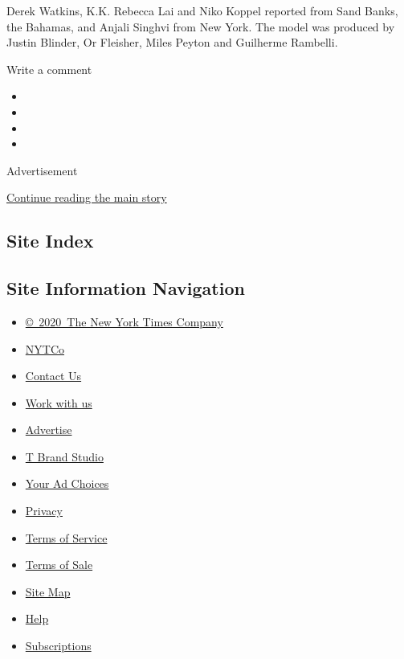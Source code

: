 Derek Watkins, K.K. Rebecca Lai and Niko Koppel reported from Sand
Banks, the Bahamas, and Anjali Singhvi from New York. The model was
produced by Justin Blinder, Or Fleisher, Miles Peyton and Guilherme
Rambelli.

Write a comment

\begin{itemize}
\item
\item
\item
\item
\end{itemize}

Advertisement

\protect\hyperlink{after-bottom}{Continue reading the main story}

\hypertarget{site-index}{%
\subsection{Site Index}\label{site-index}}

\hypertarget{site-information-navigation}{%
\subsection{Site Information
Navigation}\label{site-information-navigation}}

\begin{itemize}
\tightlist
\item
  \href{https://help.nytimes.com/hc/en-us/articles/115014792127-Copyright-notice}{©~2020~The
  New York Times Company}
\end{itemize}

\begin{itemize}
\tightlist
\item
  \href{https://www.nytco.com/}{NYTCo}
\item
  \href{https://help.nytimes.com/hc/en-us/articles/115015385887-Contact-Us}{Contact
  Us}
\item
  \href{https://www.nytco.com/careers/}{Work with us}
\item
  \href{https://nytmediakit.com/}{Advertise}
\item
  \href{http://www.tbrandstudio.com/}{T Brand Studio}
\item
  \href{https://www.nytimes.com/privacy/cookie-policy\#how-do-i-manage-trackers}{Your
  Ad Choices}
\item
  \href{https://www.nytimes.com/privacy}{Privacy}
\item
  \href{https://help.nytimes.com/hc/en-us/articles/115014893428-Terms-of-service}{Terms
  of Service}
\item
  \href{https://help.nytimes.com/hc/en-us/articles/115014893968-Terms-of-sale}{Terms
  of Sale}
\item
  \href{https://spiderbites.nytimes.com}{Site Map}
\item
  \href{https://help.nytimes.com/hc/en-us}{Help}
\item
  \href{https://www.nytimes.com/subscription?campaignId=37WXW}{Subscriptions}
\end{itemize}

